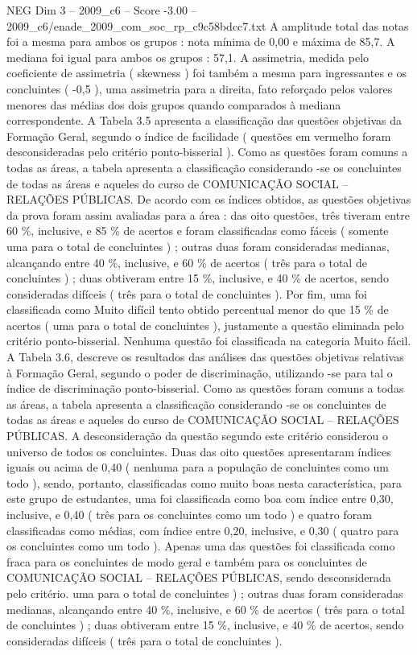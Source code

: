 \begin{textsample}{NEG Dim 3 – 2009\_c6 – Score -3.00 – 2009\_c6/enade\_2009\_com\_soc\_rp\_c9c58bdcc7.txt}
A amplitude total das notas foi a mesma para ambos os grupos : nota mínima de 0,00 e máxima de 85,7.
A mediana foi igual para ambos os grupos : 57,1.
A assimetria, medida pelo coeficiente de assimetria ( skewness ) foi também a mesma para ingressantes e os concluintes ( -0,5 ), uma assimetria para a direita, fato reforçado pelos valores menores das médias dos dois grupos quando comparados à mediana correspondente.
A Tabela 3.5 apresenta a classificação das questões objetivas da Formação Geral, segundo o índice de facilidade ( questões em vermelho foram desconsideradas pelo critério ponto-bisserial ).
Como as questões foram comuns a todas as áreas, a tabela apresenta a classificação considerando -se os concluintes de todas as áreas e aqueles do curso de COMUNICAÇÃO SOCIAL – RELAÇÕES PÚBLICAS.
De acordo com os índices obtidos, as questões objetivas da prova foram assim avaliadas para a área : das oito questões, três tiveram entre 60 \%, inclusive, e 85 \% de acertos e foram classificadas como fáceis ( somente uma para o total de concluintes ) ; outras duas foram consideradas medianas, alcançando entre 40 \%, inclusive, e 60 \% de acertos ( três para o total de concluintes ) ; duas obtiveram entre 15 \%, inclusive, e 40 \% de acertos, sendo consideradas difíceis ( três para o total de concluintes ).
Por fim, uma foi classificada como Muito difícil tento obtido percentual menor do que 15 \% de acertos ( uma para o total de concluintes ), justamente a questão eliminada pelo critério ponto-bisserial.
Nenhuma questão foi classificada na categoria Muito fácil.
A Tabela 3.6, descreve os resultados das análises das questões objetivas relativas à Formação Geral, segundo o poder de discriminação, utilizando -se para tal o índice de discriminação ponto-bisserial.
Como as questões foram comuns a todas as áreas, a tabela apresenta a classificação considerando -se os concluintes de todas as áreas e aqueles do curso de COMUNICAÇÃO SOCIAL – RELAÇÕES PÚBLICAS.
A desconsideração da questão segundo este critério considerou o universo de todos os concluintes.
Duas das oito questões apresentaram índices iguais ou acima de 0,40 ( nenhuma para a população de concluintes como um todo ), sendo, portanto, classificadas como muito boas nesta característica, para este grupo de estudantes, uma foi classificada como boa com índice entre 0,30, inclusive, e 0,40 ( três para os concluintes como um todo ) e quatro foram classificadas como médias, com índice entre 0,20, inclusive, e 0,30 ( quatro para os concluintes como um todo ).
Apenas uma das questões foi classificada como fraca para os concluintes de modo geral e também para os concluintes de COMUNICAÇÃO SOCIAL – RELAÇÕES PÚBLICAS, sendo desconsiderada pelo critério. uma para o total de concluintes ) ; outras duas foram consideradas medianas, alcançando entre 40 \%, inclusive, e 60 \% de acertos ( três para o total de concluintes ) ; duas obtiveram entre 15 \%, inclusive, e 40 \% de acertos, sendo consideradas difíceis ( três para o total de concluintes ).

\end{textsample}
